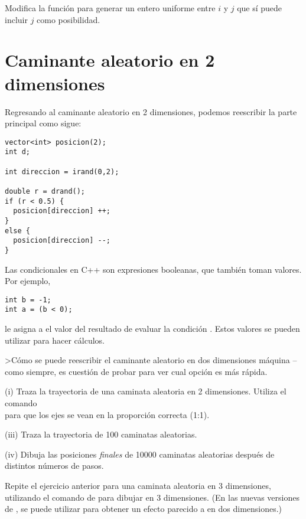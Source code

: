 \ejercicio Modifica la función  para generar un entero uniforme
entre $i$ y $j$ que sí puede incluir $j$ como posibilidad.


\section{Caminante aleatorio en 2 dimensiones}
Regresando al caminante aleatorio en 2 dimensiones,
podemos reescribir la parte principal como sigue:
\begin{lstlisting}
vector<int> posicion(2);
int d;

int direccion = irand(0,2); 	

double r = drand();
if (r < 0.5) {
  posicion[direccion] ++;
}
else {
  posicion[direccion] --;
}
\end{lstlisting}

{
\small
Las condicionales en C++ son expresiones booleanas, que también toman valores.
Por ejemplo, 
\begin{lstlisting}
int b = -1;
int a = (b < 0);
\end{lstlisting}
le asigna a  el valor del resultado de evaluar la condición .
Estos valores
se pueden utilizar para hacer cálculos.

\ejercicio >Cómo se puede reescribir el caminante aleatorio en dos dimensiones
máquina --como siempre, es cuestión de probar para ver cual opción es más
rápida.
}




(i) Traza la trayectoria de una caminata aleatoria en 2 dimensiones.
Utiliza el comando \\
 para que los ejes se vean en la
proporción correcta (1:1).

(iii) Traza la trayectoria de 100 caminatas aleatorias.

(iv) Dibuja las posiciones \emph{finales} de 10000 caminatas aleatorias después
de distintos números de pasos.

\ejercicio
Repite el ejercicio anterior para una caminata aleatoria en 3 dimensiones,
utilizando el comando  de  para dibujar en 3
dimensiones. (En las nuevas versiones de , se puede utilizar
 para obtener un efecto parecido a 
 en dos dimensiones.)


